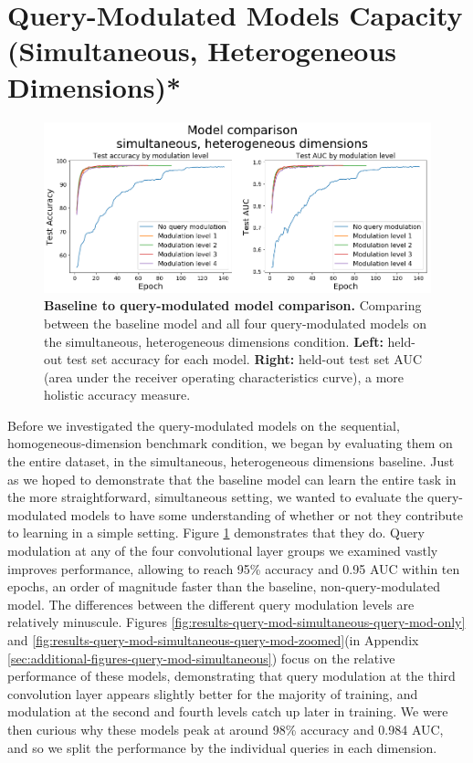 \FloatBarrier
\section{Query-Modulated Models Capacity (Simultaneous, Heterogeneous Dimensions)*}

\begin{figure}[!htb]
\centering
\includegraphics[width=\linewidth]{ch-results/figures/query_mod_simultaneous/baseline_comparison.png}
\caption{ {\bf Baseline to query-modulated model comparison.} Comparing between the baseline model and all four query-modulated models on the simultaneous, heterogeneous dimensions condition. \textbf{Left:} held-out test set accuracy for each model. \textbf{Right:} held-out test set AUC (area under the receiver operating characteristics curve), a more holistic accuracy measure.}
\label{fig:results-query-mod-simultaneous-baseline-comparison}
\end{figure}

Before we investigated the query-modulated models on the sequential, homogeneous-dimension benchmark condition, we began by evaluating them on the entire dataset, in the simultaneous, heterogeneous dimensions baseline. Just as we hoped to demonstrate that the baseline model can learn the entire task in the more straightforward, simultaneous setting, we wanted to evaluate the query-modulated models to have some understanding of whether or not they contribute to learning in a simple setting. Figure \ref{fig:results-query-mod-simultaneous-baseline-comparison} demonstrates that they do. Query modulation at any of the four convolutional layer groups we examined vastly improves performance, allowing to reach 95\% accuracy and 0.95 AUC within ten epochs, an order of magnitude faster than the baseline, non-query-modulated model. The differences between the different query modulation levels are relatively minuscule. Figures \ref{fig:results-query-mod-simultaneous-query-mod-only} and \ref{fig:results-query-mod-simultaneous-query-mod-zoomed}(in Appendix \ref{sec:additional-figures-query-mod-simultaneous}) focus on the relative performance of these models, demonstrating that query modulation at the third convolution layer appears slightly better for the majority of training, and modulation at the second and fourth levels catch up later in training. We were then curious why these models peak at around 98\% accuracy and 0.984 AUC, and so we split the performance by the individual queries in each dimension.


